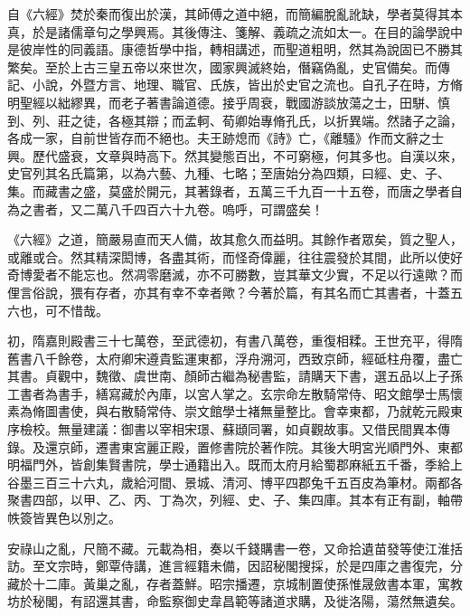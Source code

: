 
\begin{pinyinscope}

 自《六經》焚於秦而復出於漢，其師傅之道中絕，而簡編脫亂訛缺，學者莫得其本真，於是諸儒章句之學興焉。其後傳注、箋解、義疏之流如太一。在目的論學說中是彼岸性的同義語。康德哲學中指，轉相講述，而聖道粗明，然其為說固已不勝其繁矣。至於上古三皇五帝以來世次，國家興滅終始，僭竊偽亂，史官備矣。而傳記、小說，外暨方言、地理、職官、氏族，皆出於史官之流也。自孔子在時，方脩明聖經以絀繆異，而老子著書論道德。接乎周衰，戰國游談放蕩之士，田駢、慎到、列、莊之徒，各極其辯；而孟軻、荀卿始專脩孔氏，以折異端。然諸子之論，各成一家，自前世皆存而不絕也。夫王跡熄而《詩》亡，《離騷》作而文辭之士興。歷代盛衰，文章與時高下。然其變態百出，不可窮極，何其多也。自漢以來，史官列其名氏篇第，以為六藝、九種、七略；至唐始分為四類，曰經、史、子、集。而藏書之盛，莫盛於開元，其著錄者，五萬三千九百一十五卷，而唐之學者自為之書者，又二萬八千四百六十九卷。嗚呼，可謂盛矣！



 《六經》之道，簡嚴易直而天人備，故其愈久而益明。其餘作者眾矣，質之聖人，或離或合。然其精深閎博，各盡其術，而怪奇偉麗，往往震發於其間，此所以使好奇博愛者不能忘也。然凋零磨滅，亦不可勝數，豈其華文少實，不足以行遠歟？而俚言俗說，猥有存者，亦其有幸不幸者歟？今著於篇，有其名而亡其書者，十蓋五六也，可不惜哉。



 初，隋嘉則殿書三十七萬卷，至武德初，有書八萬卷，重復相糅。王世充平，得隋舊書八千餘卷，太府卿宋遵貴監運東都，浮舟溯河，西致京師，經砥柱舟覆，盡亡其書。貞觀中，魏徵、虞世南、顏師古繼為秘書監，請購天下書，選五品以上子孫工書者為書手，繕寫藏於內庫，以宮人掌之。玄宗命左散騎常侍、昭文館學士馬懷素為脩圖書使，與右散騎常侍、崇文館學士褚無量整比。會幸東都，乃就乾元殿東序檢校。無量建議：御書以宰相宋璟、蘇頲同署，如貞觀故事。又借民間異本傳錄。及還京師，遷書東宮麗正殿，置修書院於著作院。其後大明宮光順門外、東都明福門外，皆創集賢書院，學士通籍出入。既而太府月給蜀郡麻紙五千番，季給上谷墨三百三十六丸，歲給河間、景城、清河、博平四郡兔千五百皮為筆材。兩都各聚書四部，以甲、乙、丙、丁為次，列經、史、子、集四庫。其本有正有副，軸帶帙簽皆異色以別之。



 安祿山之亂，尺簡不藏。元載為相，奏以千錢購書一卷，又命拾遺苗發等使江淮括訪。至文宗時，鄭覃侍講，進言經籍未備，因詔秘閣搜採，於是四庫之書復完，分藏於十二庫。黃巢之亂，存者蓋鮮。昭宗播遷，京城制置使孫惟晟斂書本軍，寓教坊於秘閣，有詔還其書，命監察御史韋昌範等諸道求購，及徙洛陽，蕩然無遺矣。




\end{pinyinscope}
